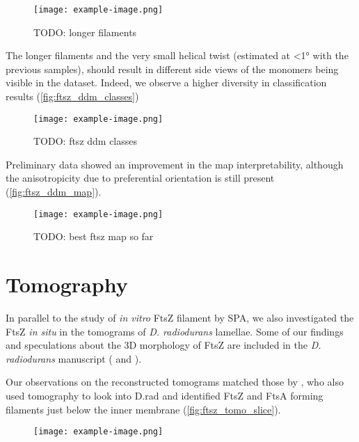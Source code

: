 \begin{figure}[ht]
    \centering
    \texttt{[image: example-image.png]}
    \caption{TODO: longer filaments}
    \label{fig:ftsz_ddm_mics}
\end{figure}

The longer filaments and the very small helical twist (estimated at <1° with the previous samples), should result in different side views of the monomers being visible in the dataset.
Indeed, we observe a higher diversity in classification results (\autoref{fig:ftsz_ddm_classes})

\begin{figure}[ht]
    \centering
    \texttt{[image: example-image.png]}
    \caption{TODO: ftsz ddm classes}
    \label{fig:ftsz_ddm_classes}
\end{figure}

Preliminary data showed an improvement in the map interpretability, although the anisotropicity due to preferential orientation is still present (\autoref{fig:ftsz_ddm_map}).

\begin{figure}[ht]
    \centering
    \texttt{[image: example-image.png]}
    \caption{TODO: best ftsz map so far}
    \label{fig:ftsz_ddm_map}
\end{figure}

\section{Tomography}

In parallel to the study of \textit{in vitro} FtsZ filament by SPA, we also investigated the FtsZ \textit{in situ} in the tomograms of \textit{D. radiodurans} lamellae.
Some of our findings and speculations about the 3D morphology of FtsZ are included in the \textit{D. radiodurans} manuscript ( and ).

Our observations on the reconstructed tomograms matched those by \citet{sextonSuperresolutionConfocalCryoCLEM2022}, who also used tomography to look into D.rad and identified FtsZ and FtsA forming filaments just below the inner membrane (\autoref{fig:ftsz_tomo_slice}).

\begin{figure}[ht]
    \centering
    \texttt{[image: example-image.png]}
    \label{fig:ftsz_tomo_slice}
\end{figure}


